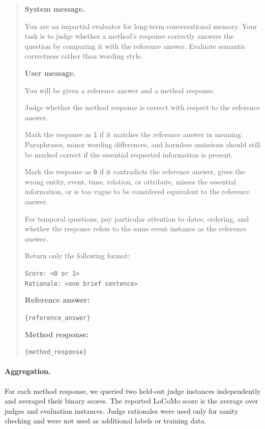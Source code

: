 \documentclass{article}
\theoremstyle{plain}
\theoremstyle{definition}
\theoremstyle{remark}
\begin{document}
\begin{quote}
\small
\textbf{System message.}

You are an impartial evaluator for long-term conversational memory. Your task is to judge whether a method's response correctly answers the question by comparing it with the reference answer. Evaluate semantic correctness rather than wording style.

\vspace{0.5em}
\textbf{User message.}

You will be given a reference answer and a method response.

Judge whether the method response is correct with respect to the reference answer.

Mark the response as \texttt{1} if it matches the reference answer in meaning. Paraphrases, minor wording differences, and harmless omissions should still be marked correct if the essential requested information is present.

Mark the response as \texttt{0} if it contradicts the reference answer, gives the wrong entity, event, time, relation, or attribute, misses the essential information, or is too vague to be considered equivalent to the reference answer.

For temporal questions, pay particular attention to dates, ordering, and whether the response refers to the same event instance as the reference answer.

Return only the following format:

\texttt{Score: <0 or 1>} \\
\texttt{Rationale: <one brief sentence>}

\vspace{0.5em}
\textbf{Reference answer:}

\texttt{\{reference\_answer\}}

\vspace{0.5em}
\textbf{Method response:}

\texttt{\{method\_response\}}
\end{quote}

\paragraph{Aggregation.}
For each method response, we queried two held-out judge instances independently and averaged their binary scores. The reported LoCoMo score is the average over judges and evaluation instances. Judge rationales were used only for sanity checking and were not used as additional labels or training data.
\end{document}
